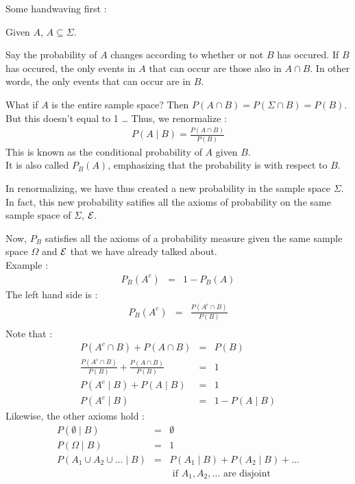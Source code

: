 Some handwaving first : 

Given $A$, $A \subseteq \Sigma$. 

Say the probability of $A$ changes according to whether or not $B$ has occured.  If $B$ has occured, the only events in $A$ that can occur are those also in $A \cap B$. In other words, the only events that can occur are in $B$. 

What if $A$ is the entire sample space? Then $P(A \cap B) = P(\Sigma \cap B) = P(B)$.   But this doesn't equal to 1 \ldots
Thus, we renormalize :
\begin{eqnarray*}
P(A \mid B) = \frac{P(A \cap B)}{P(B)}
\end{eqnarray*}
This is known as the conditional probability of $A$ given $B$.\\
It is also called $P_B(A)$, emphasizing that the probability is with respect to $B$.

In renormalizing, we have thus created a new probability in the sample space
$\Sigma$.  In fact, this new probability satifies all the axioms of probability
on the same sample space of $\Sigma$, $\cal{E}$.

Now, $P_B$ satisfies all the axioms of a probability measure given the same sample space $\Omega$ and $\cal{E}$ that we have already talked about.\\
Example : 
\begin{eqnarray*}
P_B(A^{c}) &=& 1 - P_B(A)
\end{eqnarray*}
The left hand side is : 
\begin{eqnarray*}
P_B(A^{c}) &=& \frac{P(A^{c} \cap B)}{P(B)} \\
\end{eqnarray*}
Note that : 
\begin{eqnarray*}
                          P(A^{c} \cap B) + P(A \cap B) &=& P(B) \\
\frac{P(A^{c} \cap B)}{P(B)} + \frac{P(A \cap B)}{P(B)} &=& 1 \\
P(A^{c} \mid B) + P(A \mid B) &=& 1 \\
P(A^{c} \mid B) &=& 1 - P(A \mid B)
\end{eqnarray*}
Likewise, the other axioms hold : 
\begin{eqnarray*}
P(\emptyset \mid B) &=& \emptyset \\
P(\Omega \mid B) &=& 1 \\
P(A_1 \cup A_2 \cup \ldots \mid B) &=& P(A_1 \mid B) + P(A_2 \mid B) + \ldots \\
& & \mbox{ if } A_1, A_2, \ldots \mbox{ are disjoint}
\end{eqnarray*}

